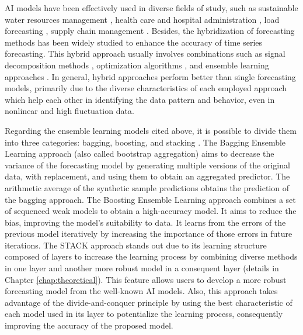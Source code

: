 \ac{AI} models have been effectively used in diverse fields of study, such as sustainable water resources management \cite{niu2021Evaluating}, health care and hospital administration \cite{piccialli2021Artificial}, load forecasting \cite{hou2022Review}, supply chain management \cite{mediavilla2022Review}. Besides, the hybridization of forecasting methods has been widely studied to enhance the accuracy of time series forecasting. This hybrid approach usually involves combinations such as signal decomposition methods \cite{song2022Application}, optimization algorithms \cite{jiang2023Multivariable}, and ensemble learning approaches \cite{ribeiro2023Cooperative}. In general, hybrid approaches perform better than single forecasting models, primarily due to the diverse characteristics of each employed approach which help each other in identifying the data pattern and behavior, even in nonlinear and high fluctuation data.

Regarding the ensemble learning models cited above, it is possible to divide them into three categories: bagging, boosting, and stacking \cite{das2022Comparison}.
%
The Bagging Ensemble Learning approach (also called bootstrap aggregation) aims to decrease the variance of the forecasting model by generating multiple versions of the original data, with replacement, and using them to obtain an aggregated predictor. The arithmetic average of the synthetic sample predictions obtains the prediction of the bagging approach. 
%
The Boosting Ensemble Learning approach combines a set of sequenced weak models to obtain a high-accuracy model. It aims to reduce the bias, improving the model's suitability to data. It learns from the errors of the previous model iteratively by increasing the importance of those errors in future iterations.
%
The \ac{STACK} approach stands out due to its learning structure composed of layers to increase the learning process by combining diverse methods in one layer and another more robust model in a consequent layer (details in Chapter \ref{chap:theoretical}). This feature allows users to develop a more robust forecasting model from the well-known \ac{AI} models. Also, this approach takes advantage of the divide-and-conquer principle by using the best characteristic of each model used in its layer to potentialize the learning process, consequently improving the accuracy of the proposed model.

